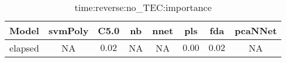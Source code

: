 \begin{table}[!ht]
	\centering
	\begin{tabular}{|c|c|c|c|c|c|c|c|}
		\hline
		Model & svmPoly & C5.0 & nb & nnet & pls & fda & pcaNNet \\ \hline
		elapsed & NA & $0.02$ & NA & NA & $0.00$ & $0.02$ & NA \\ \hline
	\end{tabular}
	\caption{time:reverse:no_TEC:importance}
	\label{tab:time:reverse:no_TEC:importance}
\end{table}
